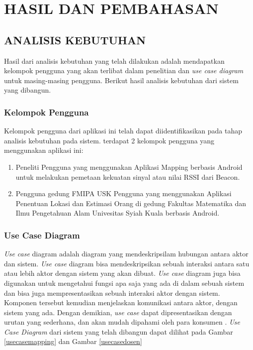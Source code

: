 \fancyhf{}
\fancyfoot[C]{\thepage}
\chapter{HASIL DAN PEMBAHASAN}
\section{ANALISIS KEBUTUHAN}

Hasil dari analisis kebutuhan yang telah dilakukan adalah mendapatkan kelompok pengguna yang akan terlibat dalam penelitian dan \textit{use case diagram} untuk masing-masing pengguna. Berikut hasil analisis kebutuhan dari sistem yang dibangun.
\subsection{Kelompok Pengguna}
Kelompok pengguna dari aplikasi ini telah dapat diidentifikasikan pada tahap analisis kebutuhan pada sistem. terdapat 2 kelompok pengguna yang menggunakan aplikasi ini:
\begin{enumerate}[1.]
	\item Peneliti
	      \newline Pengguna yang menggunakan Aplikasi Mapping berbasis Android untuk melakukan pemetaan kekuatan sinyal atau nilai RSSI dari Beacon.
	\item Pengguna gedung FMIPA USK
	      \newline Pengguna yang menggunakan Aplikasi Penentuan Lokasi dan Estimasi Orang di gedung Fakultas Matematika dan Ilmu Pengetahuan Alam Univesitas Syiah Kuala berbasis Android.
\end{enumerate}

\subsection{Use Case Diagram}
\textit{Use case} diagram adalah diagram yang mendeskripsilam hubungan antara aktor dan sistem. \textit{Use case} diagram bisa mendeskripsikan sebuah interaksi antara satu atau lebih aktor dengan sistem yang akan dibuat. \textit{Use case} diagram juga bisa digunakan untuk mengetahui fungsi apa saja yang ada di dalam sebuah sistem dan  bisa juga mempresentasikan sebuah interaksi aktor dengan sistem. Komponen tersebut kemudian menjelaskan komunikasi antara aktor,  dengan sistem yang ada. Dengan demikian, \textit{use case} dapat dipresentasikan dengan urutan yang sederhana, dan akan mudah dipahami oleh para konsumen \citep{Yu2009}. \textit{Use Case Diagram} dari sistem yang telah dibangun dapat dilihat pada Gambar \ref{usecasemapping} dan Gambar \ref{usecasedosen}

